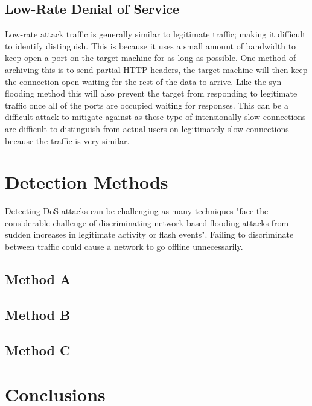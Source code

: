 \documentclass[conference, a4paper]{IEEEtran}
\begin{document}
    \subsection{Low-Rate Denial of Service}
    Low-rate attack traffic is generally similar to legitimate traffic; making it difficult to identify distinguish.\cite{two_layer_approach__DDOS}
    This is because it uses a small amount of bandwidth to keep open a port on the target machine for as long as possible.
    One method of archiving this is to send partial HTTP headers, the target machine will then keep the connection open waiting for the rest of the data to arrive.
    Like the syn-flooding method this will also prevent the target from responding to legitimate traffic once all of the ports are occupied waiting for responses.
    This can be a difficult attack to mitigate against as these type of intensionally slow connections are difficult to distinguish from actual users on legitimately slow connections because the traffic is very similar.\cite{cloudflare_low_rate}

\section{Detection Methods}
    Detecting DoS attacks can be challenging as many techniques "face the considerable challenge of discriminating network-based flooding attacks from sudden increases in legitimate activity or flash events".\cite{detection_methods_2006}
    Failing to discriminate between traffic could cause a network to go offline unnecessarily.

\subsection{Method A}
\subsection{Method B}
\subsection{Method C}

\section{Conclusions}
\end{document}
